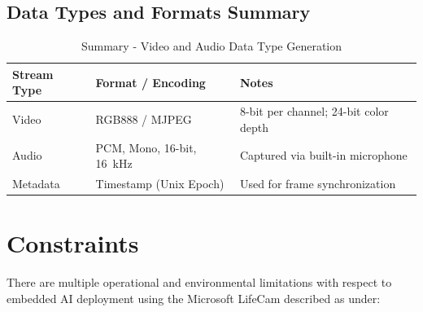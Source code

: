 \subsection{Data Types and Formats Summary}
\begin{table}[H]
	\centering
	\caption{Summary - Video and Audio Data Type Generation \cite{microsoft_lifecam_datasheet,opencv_doc_2024}}
	\label{tab:lifecam_data_types}
	\begin{tabular}{|p{3.5cm}|p{4.5cm}|p{5cm}|}
		\hline
		\textbf{Stream Type} & \textbf{Format / Encoding} & \textbf{Notes} \\ \hline
		Video & RGB888 / MJPEG & 8-bit per channel; 24-bit color depth \\ \hline
		Audio & PCM, Mono, 16-bit, 16~kHz & Captured via built-in microphone \\ \hline
		Metadata & Timestamp (Unix Epoch) & Used for frame synchronization \\ \hline
	\end{tabular}
\end{table}


\newpage
\section{Constraints}
\label{sec:lifecam_constraints}

There are multiple operational and environmental limitations with respect to embedded AI deployment using the Microsoft LifeCam described as under:

